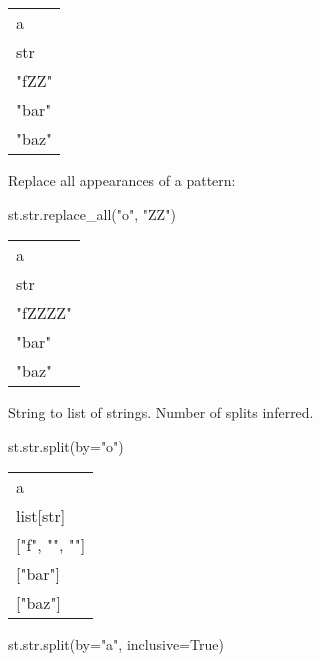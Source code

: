 \documentclass[
  letterpaper,
  DIV=11,
  numbers=noendperiod]{scrartcl}
\newenvironment{Shaded}{\begin{snugshade}}{\end{snugshade}}
\newcommand{\BuiltInTok}[1]{\textcolor[rgb]{0.00,0.23,0.31}{#1}}
\newcommand{\NormalTok}[1]{\textcolor[rgb]{0.00,0.23,0.31}{#1}}
\newcommand{\OperatorTok}[1]{\textcolor[rgb]{0.37,0.37,0.37}{#1}}
\newcommand{\StringTok}[1]{\textcolor[rgb]{0.13,0.47,0.30}{#1}}
\newcommand{\VariableTok}[1]{\textcolor[rgb]{0.07,0.07,0.07}{#1}}
\begin{document}
\begin{longtable}[]{@{}l@{}}
\toprule()
a \\
str \\
\midrule()
\endhead
"fZZ" \\
"bar" \\
"baz" \\
\bottomrule()
\end{longtable}

Replace all appearances of a pattern:

\begin{Shaded}
\begin{Highlighting}[]
\NormalTok{st.}\BuiltInTok{str}\NormalTok{.replace\_all(}\StringTok{"o"}\NormalTok{, }\StringTok{"ZZ"}\NormalTok{)}
\end{Highlighting}
\end{Shaded}

\begin{longtable}[]{@{}l@{}}
\toprule()
a \\
str \\
\midrule()
\endhead
"fZZZZ" \\
"bar" \\
"baz" \\
\bottomrule()
\end{longtable}

String to list of strings. Number of splits inferred.

\begin{Shaded}
\begin{Highlighting}[]
\NormalTok{st.}\BuiltInTok{str}\NormalTok{.split(by}\OperatorTok{=}\StringTok{"o"}\NormalTok{)}
\end{Highlighting}
\end{Shaded}

\begin{longtable}[]{@{}l@{}}
\toprule()
a \\
list{[}str{]} \\
\midrule()
\endhead
{[}"f", "", ""{]} \\
{[}"bar"{]} \\
{[}"baz"{]} \\
\bottomrule()
\end{longtable}

\begin{Shaded}
\begin{Highlighting}[]
\NormalTok{st.}\BuiltInTok{str}\NormalTok{.split(by}\OperatorTok{=}\StringTok{"a"}\NormalTok{, inclusive}\OperatorTok{=}\VariableTok{True}\NormalTok{)}
\end{Highlighting}
\end{Shaded}
\end{document}
